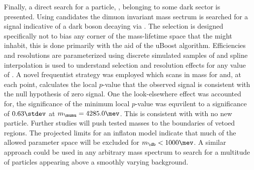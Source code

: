 


%
%
%
%


Finally, a direct search for a \np particle, \db, belonging to some dark sector is presented.
Using
\btokstrmumu candidates the dimuon invariant mass sectrum is searched for a signal indicative of a
dark boson decaying via \dbtomumu.
The selection is designed specifically not to bias any corner of the mass-lifetime space that the
\db might inhabit, this is done primarily with the aid of the uBoost algorithm.
Efficiencies and resolutions are parameterized using discrete simulated samples of \btokstrdb
and spline interpolation is used to understand selection and resolution effects for any value of
\mass{\db}.
A novel frequentist strategy was employed which scans in mass for and, at each point, calculates
the local $p$-value that the observed signal is consistent with the null hypothesis of zero signal.
One the look-elsewhere effect was accounted for, the significance of the minimum local $p$-value
was equvilent to a significance of
$0.63\stdev$ at $m_{\mumu}=4285.0\mev$.
This is consistent with with no new particle.
Further studies will push tested masses to the boundaries of vetoed regions.
The projected limits for an inflaton model indicate that much of the allowed parameter space will
be excluded for $m_\db<1000\mev$.
A similar approach could be used in any arbitrary mass spectrum to search for a multitude of
particles appearing above a smoothly varying background.


